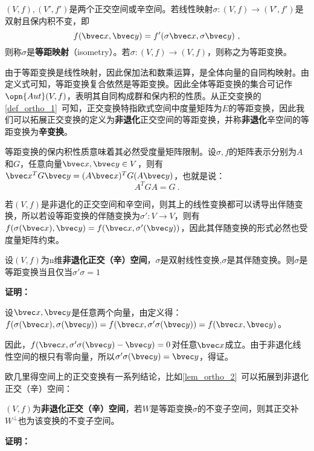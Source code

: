 

\begin{definition}{}
$(V,f),(V',f')$是两个正交空间或辛空间。若线性映射$\sigma:(V,f)\rightarrow (V',f')$是双射且保内积不变，即\begin{equation}
f(\bvec x,\bvec y)=f'(\sigma \bvec x,\sigma \bvec y)~,
\end{equation}
则称$\sigma $是\textbf{等距映射}（isometry）。若$\sigma:(V,f)\rightarrow (V,f)$，则称之为等距变换。
\end{definition}
由于等距变换是线性映射，因此保加法和数乘运算，是全体向量的自同构映射。由定义式可知，等距变换复合依然是等距变换。因此全体等距变换的集合可记作$\opn{Aut}(V,f)$，表明其自同构成群和保内积的性质。从正交变换的\autoref{def_ortho_1}~可知，正交变换特指欧式空间中度量矩阵为$E$的等距变换，因此我们可以拓展正交变换的定义为\textbf{非退化}正交空间的等距变换，并称\textbf{非退化}辛空间的等距变换为\textbf{辛变换}。

等距变换的保内积性质意味着其必然受度量矩阵限制。设$\sigma,f$的矩阵表示分别为$A$和$G$，任意向量$\bvec x,\bvec y\in V$，则有$\bvec x^{T}G\bvec y=(A\bvec x)^TG(A\bvec y)$，也就是说：
\begin{equation}
A^TGA=G~.
\end{equation}

若$(V,f)$是非退化的正交空间和辛空间，则其上的线性变换都可以诱导出伴随变换，所以若设等距变换的伴随变换为$\sigma':V\rightarrow V$，则有$f(\sigma(\bvec x),\bvec y)=f(\bvec x,\sigma'(\bvec y))$，因此其伴随变换的形式必然也受度量矩阵约束。
\begin{theorem}{}
设$(V,f)$为n维\textbf{非退化正交（辛）空间}，$\sigma$是双射线性变换,$\sigma$是其伴随变换。则$\sigma$是等距变换当且仅当$\sigma'\sigma=1$
\end{theorem}
\textbf{证明：}

设$\bvec x,\bvec y$是任意两个向量，由定义得：$f(\sigma(\bvec x),\sigma(\bvec y))=f(\bvec x,\sigma'\sigma(\bvec y))=f(\bvec x,\bvec y)$。

因此，$f(\bvec x,\sigma'\sigma(\bvec y)-\bvec y)=0$对任意$\bvec x$成立。由于非退化线性空间的根只有零向量，所以$\sigma'\sigma(\bvec y)=\bvec y$，得证。

欧几里得空间上的正交变换有一系列结论，比如\autoref{lem_ortho_2}~可以拓展到非退化正交（辛）空间：
\begin{theorem}{}
$(V,f)$为\textbf{非退化正交（辛）空间}，若$W$是等距变换$\sigma$的不变子空间，则其正交补$W^{\bot}$也为该变换的不变子空间。
\end{theorem}
\textbf{证明：}

